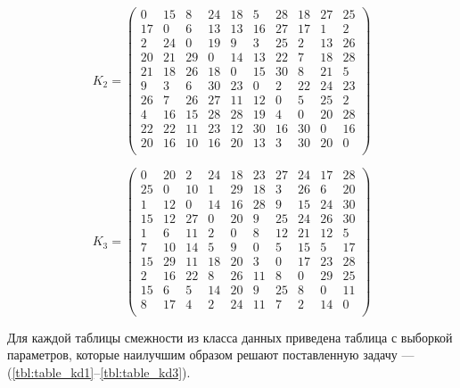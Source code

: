 \begin{equation}
	\label{eq:kd2}
	K_{2} = \begin{pmatrix}
		0 & 15 & 8 & 24 & 18 & 5 & 28 & 18 & 27 & 25 \\
		17 & 0 & 6 & 13 & 13 & 16 & 27 & 17 & 1 & 2 \\
		2 & 24 & 0 & 19 & 9 & 3 & 25 & 2 & 13 & 26 \\
		20 & 21 & 29 & 0 & 14 & 13 & 22 & 7 & 18 & 28 \\
		21 & 18 & 26 & 18 & 0 & 15 & 30 & 8 & 21 & 5 \\
		9 & 3 & 6 & 30 & 23 & 0 & 2 & 22 & 24 & 23 \\
		26 & 7 & 26 & 27 & 11 & 12 & 0 & 5 & 25 & 2 \\
		4 & 16 & 15 & 28 & 28 & 19 & 4 & 0 & 20 & 28 \\
		22 & 22 & 11 & 23 & 12 & 30 & 16 & 30 & 0 & 16 \\
		20 & 16 & 10 & 16 & 20 & 13 & 3 & 30 & 20 & 0 \\
	\end{pmatrix}
\end{equation}

\begin{equation}
	\label{eq:kd3}
	K_{3} = \begin{pmatrix}
		0 & 20 & 2 & 24 & 18 & 23 & 27 & 24 & 17 & 28 \\
		25 & 0 & 10 & 1 & 29 & 18 & 3 & 26 & 6 & 20 \\
		1 & 12 & 0 & 14 & 16 & 28 & 9 & 15 & 24 & 30 \\
		15 & 12 & 27 & 0 & 20 & 9 & 25 & 24 & 26 & 30 \\
		1 & 6 & 11 & 2 & 0 & 8 & 12 & 21 & 12 & 5 \\
		7 & 10 & 14 & 5 & 9 & 0 & 5 & 15 & 5 & 17 \\
		15 & 29 & 11 & 18 & 20 & 3 & 0 & 17 & 23 & 28 \\
		2 & 16 & 22 & 8 & 26 & 11 & 8 & 0 & 29 & 25 \\
		15 & 6 & 5 & 14 & 20 & 9 & 25 & 8 & 0 & 11 \\
		8 & 17 & 4 & 2 & 24 & 11 & 7 & 2 & 14 & 0 \\
	\end{pmatrix}
\end{equation}

Для каждой таблицы смежности из класса данных приведена таблица с выборкой параметров, которые наилучшим образом решают поставленную задачу --- (\ref{tbl:table_kd1}--\ref{tbl:table_kd3}).

